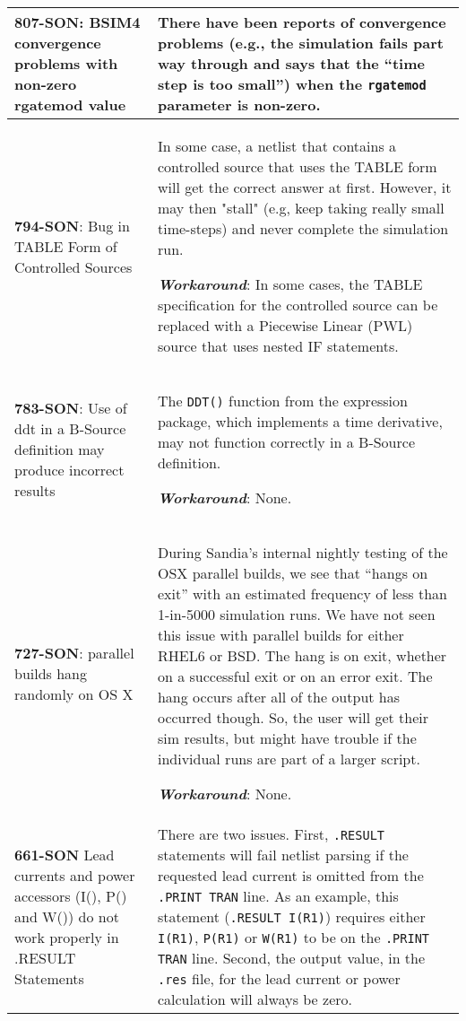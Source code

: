 {\begin{longtable}[h] {>{\raggedright\small}m{2in}|>{\raggedright\let\\\tabularnewline\small}m{3.5in}}
\textbf{807-SON}: BSIM4 convergence problems with non-zero rgatemod value &
There have been reports of convergence problems (e.g., the \Xyce{}
simulation fails part way through and says that the ``time step is too
small'') when the \texttt{rgatemod} parameter is non-zero. \\ \hline

\textbf{794-SON}: Bug in TABLE Form of \Xyce{} Controlled Sources & In some case, a \Xyce{}
netlist that contains a controlled source that uses the TABLE form will get
the correct answer at first.  However, it may then "stall" (e.g, keep
taking really small time-steps) and never complete the simulation run.

\textbf{\textit{Workaround}}: In some cases, the TABLE specification for the controlled
source can be replaced with a Piecewise Linear (PWL) source that uses
nested IF statements. \\ \hline

\textbf{783-SON}: Use of ddt in a B-Source definition may produce incorrect
results & The \texttt{DDT()} function from the \Xyce{} expression
package, which implements a time derivative, may not function
correctly in a B-Source definition.

\textbf{\textit{Workaround}}: None. \\ \hline

\textbf{727-SON}: \Xyce{} parallel builds hang randomly on OS X & During
Sandia's internal nightly testing of the OSX parallel builds, we see
that \Xyce{} ``hangs on exit'' with an estimated frequency of less
than 1-in-5000 simulation runs.  We have not seen this issue with
parallel builds for either RHEL6 or BSD.  The hang is on exit, whether
on a successful exit or on an error exit.  The hang occurs after all
of the \Xyce{} output has occurred though.  So, the user will get
their sim results, but might have trouble if the individual \Xyce{}
runs are part of a larger script.

\textbf{\textit{Workaround}}: None. \\ \hline

\textbf{661-SON} Lead currents and power accessors (I(), P() and W()) do
not work properly in .RESULT Statements & There are two issues.
First, \texttt{.RESULT} statements will fail netlist parsing if the
requested lead current is omitted from the \texttt{.PRINT TRAN}
line.  As an example, this statement (\texttt{.RESULT I(R1)}) requires
either \texttt{I(R1)},
\texttt{P(R1)} or \texttt{W(R1)} to be on the \texttt{.PRINT TRAN} line.
Second, the output value, in the \texttt{.res} file, for the lead
current or power calculation will always be zero.
\\ \hline


\end{longtable}}
